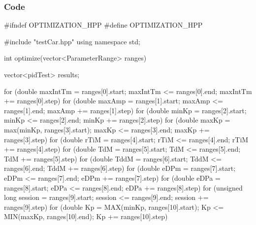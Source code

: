 \documentclass[a4paper,12pt]{article}
\begin{document}
\subsubsection{Code}
\begin{lstlising}[language=C++]
#ifndef OPTIMIZATION_HPP
#define OPTIMIZATION_HPP

#include "testCar.hpp"
using namespace std;

int optimize(vector<ParameterRange> ranges)
{
    vector<pidTest> results;

        for (double maxIntTm = ranges[0].start; maxIntTm <= ranges[0].end; maxIntTm += ranges[0].step)
        {
                for (double maxAmp = ranges[1].start; maxAmp <= ranges[1].end; maxAmp += ranges[1].step)
                {
                        for (double minKp = ranges[2].start; minKp <= ranges[2].end; minKp += ranges[2].step)
                        {
                                for (double maxKp = max(minKp, ranges[3].start);
                                         maxKp <= ranges[3].end; maxKp += ranges[3].step)
                                {
                                        for (double rTiM = ranges[4].start; rTiM <= ranges[4].end; rTiM += ranges[4].step)
                                        {
                                                for (double TdM = ranges[5].start; TdM <= ranges[5].end; TdM += ranges[5].step)
                                                {
                                                        for (double TddM = ranges[6].start; TddM <= ranges[6].end; TddM += ranges[6].step)
                                                        {
                                                                for (double eDPm = ranges[7].start; eDPm <= ranges[7].end; eDPm += ranges[7].step)
                                                                {
                                                                        for (double eDPa = ranges[8].start; eDPa <= ranges[8].end; eDPa += ranges[8].step)
                                                                        {
                                                                                for (unsigned long session = ranges[9].start; session <= ranges[9].end; session += ranges[9].step)
                                                                                {
                                                                                        for (double Kp = MAX(minKp, ranges[10].start);
                                                                                                 Kp <= MIN(maxKp, ranges[10].end); Kp += ranges[10].step)
}}}}}}}}}}}
\end{lstlising}
\end{document}
